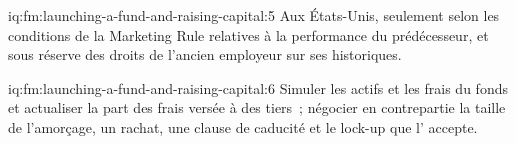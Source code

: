 \begin{solution}{iq:fm:launching-a-fund-and-raising-capital:5}
Aux États-Unis, seulement selon les conditions de la Marketing Rule relatives à la performance du prédécesseur, et sous réserve des droits de l'ancien employeur sur ses
historiques.
\end{solution}

\begin{solution}{iq:fm:launching-a-fund-and-raising-capital:6}
Simuler les actifs et les frais du fonds et actualiser la part des frais versée à des tiers~; négocier en contrepartie la taille de l'amorçage, un rachat, une clause de caducité et le lock-up
que l' accepte.
\end{solution}
